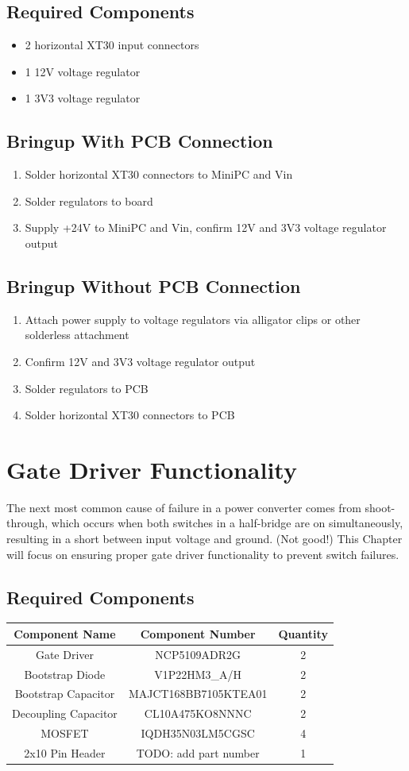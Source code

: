 \documentclass[]{report}
\begin{document}
\section{Required Components}
\begin{itemize}
	\item 2 horizontal XT30 input connectors
	\item 1 12V voltage regulator
	\item 1 3V3 voltage regulator
\end{itemize}
\section {Bringup With PCB Connection} \label{voltagewithpcb}
\begin{enumerate}
	\item Solder horizontal XT30 connectors to MiniPC and Vin
	\item Solder regulators to board
	\item Supply +24V to MiniPC and Vin, confirm 12V and 3V3 voltage regulator output
\end{enumerate}
\section{Bringup Without PCB Connection}\label{voltagenopcb}
\begin{enumerate}
	\item Attach power supply to voltage regulators via alligator clips or other solderless attachment
	\item Confirm 12V and 3V3 voltage regulator output
	\item Solder regulators to PCB
	\item Solder horizontal XT30 connectors to PCB
\end{enumerate}
\chapter{Gate Driver Functionality} \label{drivers}
The next most common cause of failure in a power converter comes from shoot-through, which occurs when both switches in a half-bridge are on simultaneously, resulting in a short between input voltage and ground. (Not good!) This Chapter will focus on ensuring proper gate driver functionality to prevent switch failures. 
\section{Required Components}
\begin{tabular}{|c|c|c|}
	\hline
	Component Name & Component Number & Quantity \\
	\hline
	Gate Driver & NCP5109ADR2G & 2 \\
	\hline
	Bootstrap Diode & V1P22HM3_A/H & 2 \\
	\hline
	Bootstrap Capacitor & MAJCT168BB7105KTEA01 & 2 \\
	\hline
	Decoupling Capacitor & CL10A475KO8NNNC & 2 \\
	\hline
	MOSFET & IQDH35N03LM5CGSC  & 4 \\
	\hline
	2x10 Pin Header & TODO: add part number & 1 \\
	\hline
\end{tabular}
\end{document}
